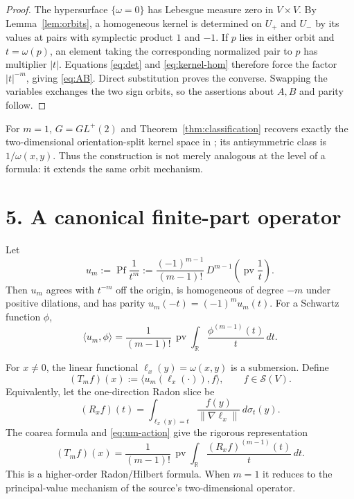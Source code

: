 \documentclass[11pt]{article}
\newcommand{\R}{\mathbb R}
\newcommand{\Pf}{\operatorname{Pf}}
\newcommand{\pv}{\operatorname{pv}}
\begin{document}
\begin{proof}
The hypersurface $\{\omega=0\}$ has Lebesgue measure zero in $V\times V$.  By Lemma~\ref{lem:orbits}, a homogeneous kernel is determined on $U_+$ and $U_-$ by its values at pairs with symplectic product $1$ and $-1$.  If $p$ lies in either orbit and $t=\omega(p)$, an element taking the corresponding normalized pair to $p$ has multiplier $|t|$.  Equations \eqref{eq:det} and \eqref{eq:kernel-hom} therefore force the factor $|t|^{-m}$, giving \eqref{eq:AB}.  Direct substitution proves the converse.  Swapping the variables exchanges the two sign orbits, so the assertions about $A,B$ and parity follow.
\end{proof}

For $m=1$, $G=GL^+(2)$ and Theorem~\ref{thm:classification} recovers exactly the two-dimensional orientation-split kernel space in \cite{AK}; its antisymmetric class is $1/\omega(x,y)$.  Thus the construction is not merely analogous at the level of a formula: it extends the same orbit mechanism.

\section*{5. A canonical finite-part operator}

Let
\begin{equation}\label{eq:um}
 u_m:=\Pf\frac1{t^m}
 :=\frac{(-1)^{m-1}}{(m-1)!}\,D^{m-1}\!\left(\pv\frac1t\right).
\end{equation}
Then $u_m$ agrees with $t^{-m}$ off the origin, is homogeneous of degree $-m$ under positive dilations, and has parity
$u_m(-t)=(-1)^m u_m(t)$.  For a Schwartz function $\phi$,
\begin{equation}\label{eq:um-action}
 \langle u_m,\phi\rangle
 =\frac1{(m-1)!}\,\pv\!\int_{\R}\frac{\phi^{(m-1)}(t)}t\,dt.
\end{equation}

For $x\ne0$, the linear functional $\ell_x(y)=\omega(x,y)$ is a submersion.  Define
\begin{equation}\label{eq:Tm}
 (T_mf)(x):=\big\langle u_m(\ell_x(\cdot)),f\big\rangle,
 \qquad f\in\mathcal S(V).
\end{equation}
Equivalently, let the one-direction Radon slice be
\[
 (R_xf)(t)=\int_{\ell_x(y)=t}\frac{f(y)}{\|\nabla\ell_x\|}\,d\sigma_t(y).
\]
The coarea formula and \eqref{eq:um-action} give the rigorous representation
\begin{equation}\label{eq:radon-hilbert}
 (T_mf)(x)=\frac1{(m-1)!}\,
 \pv\!\int_{\R}\frac{(R_xf)^{(m-1)}(t)}t\,dt.
\end{equation}
This is a higher-order Radon/Hilbert formula.  When $m=1$ it reduces to the principal-value mechanism of the source's two-dimensional operator.
\end{document}
